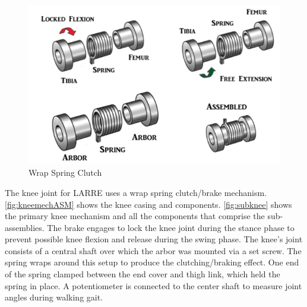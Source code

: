 \begin{figure}
    \centering
    \includegraphics[scale=0.45]{images/mech_design/wrapspringclutch.png}
    \caption[Wrap Spring Clutch]{Wrap Spring Clutch \cite{irby1999optimization}}
    \label{fig:WrapSpringClutch}
\end{figure}


The knee joint for LARRE uses a wrap spring clutch/brake mechanism. \autoref{fig:kneemechASM} shows the knee casing and components.  \autoref{fig:subknee} shows the primary knee mechanism and all the components that comprise the sub-assemblies. The brake engages to lock the knee joint during the stance phase to prevent possible knee flexion and release during the swing phase. The knee's joint consists of a central shaft over which the arbor was mounted via a set screw. The spring wraps around this setup to produce the clutching/braking effect. One end of the spring clamped between the end cover and thigh link, which held the spring in place. A potentiometer is connected to the center shaft to measure joint angles during walking gait.


